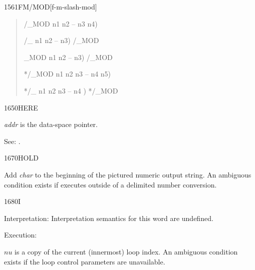 \begin{newword}{1561}{FM/MOD}[f-m-slash-mod]
\begin{rationale}
		\begin{quote}\ttfamily
			\word{:} /\_MOD  n1 n2 -- n3 n4)
				   
			\word{;}

			\word{:} /\_  n1 n2 -- n3)
				/\_MOD  
			\word{;}

			\word{:} \_MOD  n1 n2 -- n3)
				/\_MOD 
			\word{;}

			\word{:} */\_MOD  n1 n2 n3 -- n4 n5)
				   
			\word{;}

			\word{:} */\_  n1 n2 n3 -- n4 )
				*/\_MOD  
			\word{;}
		\end{quote}
	\end{rationale}
\end{newword}


\begin{newword}{1650}{HERE}

	\emph{addr} is the data-space pointer.

\item[See:]
	.
\end{newword}


\begin{newword}{1670}{HOLD}

	Add \emph{char} to the beginning of the pictured numeric output
	string. An ambiguous condition exists if  executes
	outside of a   delimited number conversion.
\end{newword}


\begin{newword*}{1680}{I}
\item[Interpretation:]
	Interpretation semantics for this word are undefined.

\item[Execution:]

	$n$\textbar$u$ is a copy of the current (innermost) loop index.
	An ambiguous condition exists if the loop control parameters
	are unavailable.
\end{newword*}


